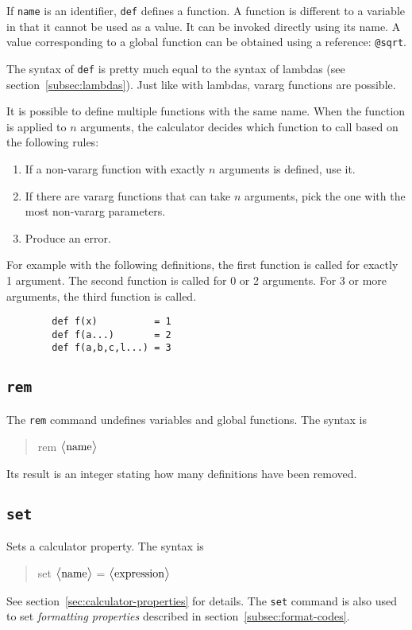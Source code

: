 \documentclass[10pt]{article}
\newcommand{\argument}[1]{{${\big<}\text{\textrm{#1}}{\big>}$}}
\newenvironment{code}{\begin{quote}\ttfamily}{\end{quote}}
\begin{document}
    If \verb|name| is an identifier, \verb|def| defines a function.
    A function is different to a variable in that it cannot be used as a value.
    It can be invoked directly using its name.
    A value corresponding to a global function can be obtained using a reference: \verb|@sqrt|.
    
    The syntax of \verb|def| is pretty much equal to the syntax of lambdas (see section~\ref{subsec:lambdas}).
    Just like with lambdas, vararg functions are possible.
    
    It is possible to define multiple functions with the same name.
    When the function is applied to $ n $ arguments, the calculator decides which function to call based on the following rules:
    \begingroup
    \setlength{\parskip}{0pt}
    \begin{enumerate}
        \item If a non-vararg function with exactly $ n $ arguments is defined, use it.
        \item If there are vararg functions that can take $ n $ arguments, pick the one with the most non-vararg parameters.
        \item Produce an error.
    \end{enumerate}
    \endgroup
    For example with the following definitions, the first function is called for exactly 1 argument.
    The second function is called for 0 or 2 arguments.
    For 3 or more arguments, the third function is called.
    \begin{verbatim}
        def f(x)          = 1
        def f(a...)       = 2
        def f(a,b,c,l...) = 3
    \end{verbatim}
    
    \subsection{\texttt{rem}}\label{subsec:cmd-rem}
    The \verb|rem| command undefines variables and global functions.
    The syntax is
    \begin{code}
        rem \argument{name}
    \end{code}
    Its result is an integer stating how many definitions have been removed.
    
    \subsection{\texttt{set}}\label{subsec:cmd-set}
    Sets a calculator property.
    The syntax is
    \begin{code}
        set \argument{name} = \argument{expression}
    \end{code}
    See section~\ref{sec:calculator-properties} for details.
    The \texttt{set} command is also used to set \textit{formatting properties} described in section~\ref{subsec:format-codes}.
    
\end{document}
